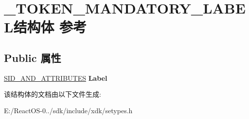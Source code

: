 \hypertarget{struct___t_o_k_e_n___m_a_n_d_a_t_o_r_y___l_a_b_e_l}{}\section{\+\_\+\+T\+O\+K\+E\+N\+\_\+\+M\+A\+N\+D\+A\+T\+O\+R\+Y\+\_\+\+L\+A\+B\+E\+L结构体 参考}
\label{struct___t_o_k_e_n___m_a_n_d_a_t_o_r_y___l_a_b_e_l}
\subsection*{Public 属性}
\begin{DoxyCompactItemize}
\item 
\mbox{\label{struct___t_o_k_e_n___m_a_n_d_a_t_o_r_y___l_a_b_e_l_a884d1db8bf055395aab74639c9f23154}} 
\hyperlink{struct___s_i_d___a_n_d___a_t_t_r_i_b_u_t_e_s}{S\+I\+D\+\_\+\+A\+N\+D\+\_\+\+A\+T\+T\+R\+I\+B\+U\+T\+ES} {\bfseries Label}
\end{DoxyCompactItemize}


该结构体的文档由以下文件生成\+:\begin{DoxyCompactItemize}
\item 
E\+:/\+React\+O\+S-\/0../sdk/include/xdk/setypes.\+h\end{DoxyCompactItemize}
